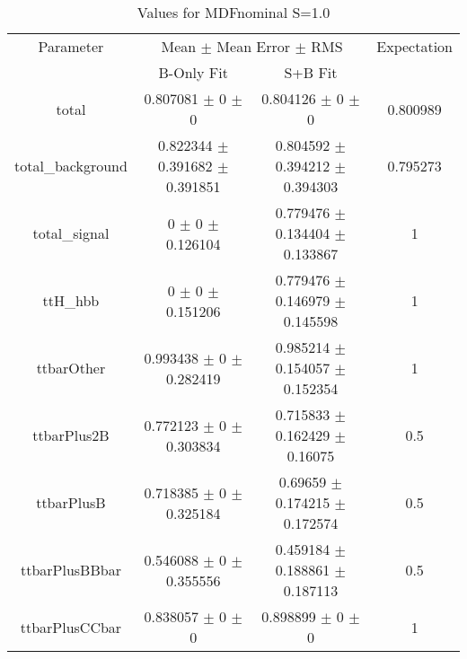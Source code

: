 \begin{table}
\centering
\caption{Values for MDFnominal S=1.0}
\begin{tabular}{cccc}
\toprule
Parameter & \multicolumn{2}{c}{Mean $\pm$ Mean Error $\pm$ RMS} & Expectation\\
 & B-Only Fit & S+B Fit & \\
\midrule
total & \num{0.807081} $\pm$ \num{0} $\pm$ \num{0} & \num{0.804126} $\pm$ \num{0} $\pm$ \num{0} & \num{0.800989}\\
total\_background & \num{0.822344} $\pm$ \num{0.391682} $\pm$ \num{0.391851} & \num{0.804592} $\pm$ \num{0.394212} $\pm$ \num{0.394303} & \num{0.795273}\\
total\_signal & \num{0} $\pm$ \num{0} $\pm$ \num{0.126104} & \num{0.779476} $\pm$ \num{0.134404} $\pm$ \num{0.133867} & \num{1}\\
ttH\_hbb & \num{0} $\pm$ \num{0} $\pm$ \num{0.151206} & \num{0.779476} $\pm$ \num{0.146979} $\pm$ \num{0.145598} & \num{1}\\
ttbarOther & \num{0.993438} $\pm$ \num{0} $\pm$ \num{0.282419} & \num{0.985214} $\pm$ \num{0.154057} $\pm$ \num{0.152354} & \num{1}\\
ttbarPlus2B & \num{0.772123} $\pm$ \num{0} $\pm$ \num{0.303834} & \num{0.715833} $\pm$ \num{0.162429} $\pm$ \num{0.16075} & \num{0.5}\\
ttbarPlusB & \num{0.718385} $\pm$ \num{0} $\pm$ \num{0.325184} & \num{0.69659} $\pm$ \num{0.174215} $\pm$ \num{0.172574} & \num{0.5}\\
ttbarPlusBBbar & \num{0.546088} $\pm$ \num{0} $\pm$ \num{0.355556} & \num{0.459184} $\pm$ \num{0.188861} $\pm$ \num{0.187113} & \num{0.5}\\
ttbarPlusCCbar & \num{0.838057} $\pm$ \num{0} $\pm$ \num{0} & \num{0.898899} $\pm$ \num{0} $\pm$ \num{0} & \num{1}\\
\bottomrule
\end{tabular}
\end{table}